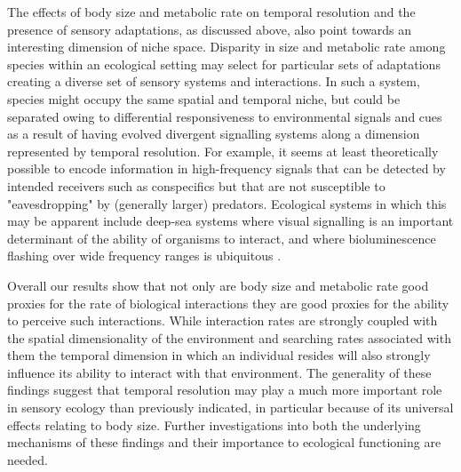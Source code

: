 The effects of body size and metabolic rate on temporal resolution and the presence of sensory adaptations, as discussed above, also point towards an interesting dimension of niche space. Disparity in size and metabolic rate among species within an ecological setting may select for particular sets of adaptations creating a diverse set of sensory systems and interactions. In such a system, species might occupy the same spatial and temporal niche, but could be separated owing to differential responsiveness to environmental signals and cues as a result of having evolved divergent signalling systems along a dimension represented by temporal resolution. For example, it seems at least theoretically possible to encode information in high-frequency signals that can be detected by intended receivers such as conspecifics but that are not susceptible to "eavesdropping" by (generally larger) predators. Ecological systems in which this may be apparent include deep-sea systems where visual signalling is an important determinant of the ability of organisms to interact, and where bioluminescence flashing over wide frequency ranges is ubiquitous \citep{haddock2005bioluminescent,widder2010bioluminescence}.


Overall our results show that not only are body size and metabolic rate good proxies for the rate of biological interactions they are good proxies for the ability to perceive such interactions. While interaction rates are strongly coupled with the spatial dimensionality of the environment and searching rates associated with them \citep{pawar2012dimensionality} the temporal dimension in which an individual resides will also strongly influence its ability to interact with that environment. The generality of these findings suggest that temporal resolution may play a much more important role in sensory ecology than previously indicated, in particular because of its universal effects relating to body size. Further investigations into both the underlying mechanisms of these findings and their importance to ecological functioning are needed.





